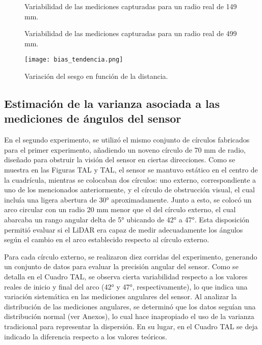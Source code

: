 \begin{figure}[H]
	\centering
	\caption{Variabilidad de las mediciones capturadas para un radio real de 149 mm.}
	\label{fig:lecturas1}
\end{figure}

\begin{figure}[H]
	\centering
	\caption{Variabilidad de las mediciones capturadas para un radio real de 499 mm.}
	\label{fig:lecturas2}
\end{figure}

\begin{figure}[H]
	\centering
	\texttt{[image: bias\_tendencia.png]}
	\caption{Variación del sesgo en función de la distancia.}
	\label{fig:bias_tendencia}
\end{figure}

\subsection{Estimación de la varianza asociada a las mediciones de ángulos del sensor}
En el segundo experimento, se utilizó el mismo conjunto de círculos fabricados para el primer experimento, añadiendo un noveno círculo de 70 mm de radio, diseñado para obstruir la visión del sensor en ciertas direcciones. Como se muestra en las Figuras TAL y TAL, el sensor se mantuvo estático en el centro de la cuadrícula, mientras se colocaban dos círculos: uno externo, correspondiente a uno de los mencionados anteriormente, y el círculo de obstrucción visual, el cual incluía una ligera abertura de 30° aproximadamente. Junto a esto, se colocó un arco circular con un radio 20 mm menor que el del círculo externo, el cual abarcaba un rango angular delta de 5° ubicando de 42° a 47°. Esta disposición permitió evaluar si el LiDAR era capaz de medir adecuadamente los ángulos según el cambio en el arco establecido respecto al círculo externo.

Para cada círculo externo, se realizaron diez corridas del experimento, generando un conjunto de datos para evaluar la precisión angular del sensor. Como se detalla en el Cuadro TAL, se observa cierta variabilidad respecto a los valores reales de inicio y final del arco (42° y 47°, respectivamente), lo que indica una variación sistemática en las mediciones angulares del sensor. Al analizar la distribución de las mediciones angulares, se determinó que los datos seguían una distribución normal (ver Anexos), lo cual hace inapropiado el uso de la varianza tradicional para representar la dispersión. En su lugar, en el Cuadro TAL se deja indicado la diferencia respecto a los valores teóricos.

